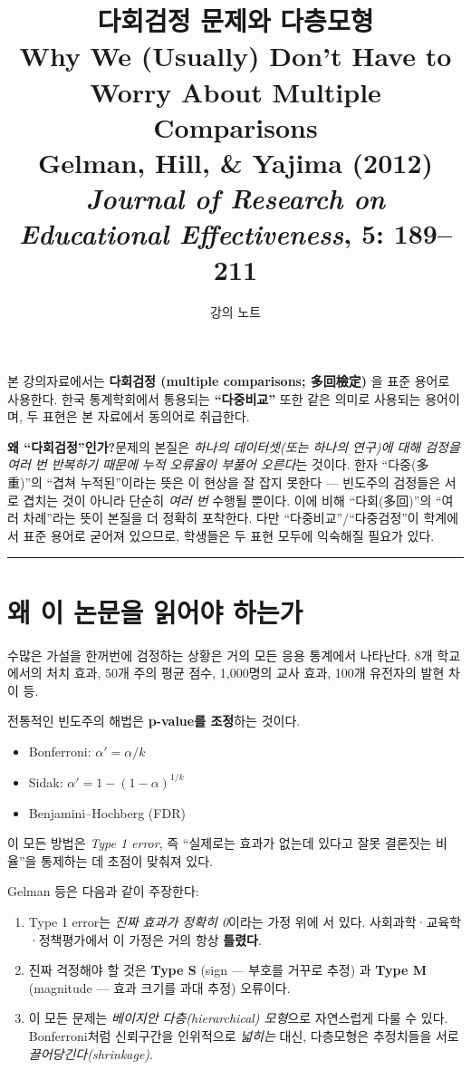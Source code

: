 \documentclass[11pt,a4paper]{article}
\title{
  \LARGE 다회검정 문제와 다층모형 \\[4pt]
  \large Why We (Usually) Don't Have to Worry About Multiple Comparisons \\[2pt]
  \small Gelman, Hill, \& Yajima (2012) \\
  \emph{Journal of Research on Educational Effectiveness}, 5: 189--211
}
\author{강의 노트}
\date{}
\begin{document}
\maketitle

\begin{termbox}
본 강의자료에서는 \textbf{다회검정 (multiple comparisons; 多回檢定)} 을 표준 용어로 사용한다.
한국 통계학회에서 통용되는 \textbf{``다중비교''} 또한 같은 의미로 사용되는 용어이며, 두 표현은 본 자료에서 동의어로 취급한다.

\smallskip
\textbf{왜 ``다회검정''인가?}\quad 문제의 본질은 \emph{하나의 데이터셋(또는 하나의 연구)에 대해 검정을 여러 번 반복하기 때문에 누적 오류율이 부풀어 오른다}는 것이다.
한자 ``다중(多重)''의 ``겹쳐 누적된''이라는 뜻은 이 현상을 잘 잡지 못한다 --- 빈도주의 검정들은 서로 겹치는 것이 아니라 단순히 \emph{여러 번} 수행될 뿐이다.
이에 비해 ``다회(多回)''의 ``여러 차례''라는 뜻이 본질을 더 정확히 포착한다.
다만 ``다중비교''/``다중검정''이 학계에서 표준 용어로 굳어져 있으므로, 학생들은 두 표현 모두에 익숙해질 필요가 있다.
\end{termbox}

\tableofcontents
\vspace{1em}
\hrule
\vspace{1em}

\section{왜 이 논문을 읽어야 하는가}

수많은 가설을 한꺼번에 검정하는 상황은 거의 모든 응용 통계에서 나타난다.
8개 학교에서의 처치 효과, 50개 주의 평균 점수, 1{,}000명의 교사 효과, 100개 유전자의 발현 차이 등.

전통적인 빈도주의 해법은 \textbf{p-value를 조정}하는 것이다.
\begin{itemize}
  \item Bonferroni: $\alpha' = \alpha / k$
  \item Sidak: $\alpha' = 1 - (1-\alpha)^{1/k}$
  \item Benjamini--Hochberg (FDR)
\end{itemize}
이 모든 방법은 \emph{Type 1 error}, 즉 ``실제로는 효과가 없는데 있다고 잘못 결론짓는 비율''을 통제하는 데 초점이 맞춰져 있다.

\begin{keyidea}
Gelman 등은 다음과 같이 주장한다:
\begin{enumerate}
  \item Type 1 error는 \emph{진짜 효과가 정확히 0}이라는 가정 위에 서 있다.
        사회과학·교육학·정책평가에서 이 가정은 거의 항상 \textbf{틀렸다}.
  \item 진짜 걱정해야 할 것은 \textbf{Type S} (sign --- 부호를 거꾸로 추정) 과 \textbf{Type M} (magnitude --- 효과 크기를 과대 추정) 오류이다.
  \item 이 모든 문제는 \emph{베이지안 다층(hierarchical) 모형}으로 자연스럽게 다룰 수 있다.
        Bonferroni처럼 신뢰구간을 인위적으로 \emph{넓히는} 대신, 다층모형은 추정치들을 서로 \emph{끌어당긴다(shrinkage)}.
\end{enumerate}
\end{keyidea}
\end{document}

